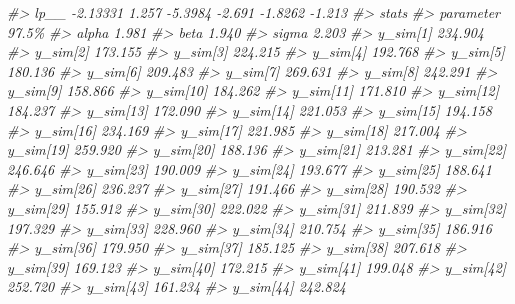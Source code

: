 \documentclass[
  10pt,
  italian,
  a4paper,
  extrafontsizes,onecolumn,openright
  ]{memoir}
\newenvironment{Shaded}{\begin{snugshade}}{\end{snugshade}}
\newcommand{\CommentTok}[1]{\textcolor[rgb]{0.56,0.35,0.01}{\textit{#1}}}
\begin{document}
\begin{Shaded}
\begin{Highlighting}[]
\CommentTok{\#\textgreater{}   lp\_\_       {-}2.13331   1.257   {-}5.3984  {-}2.691 {-}1.8262 {-}1.213}
\CommentTok{\#\textgreater{}             stats}
\CommentTok{\#\textgreater{} parameter      97.5\%}
\CommentTok{\#\textgreater{}   alpha        1.981}
\CommentTok{\#\textgreater{}   beta         1.940}
\CommentTok{\#\textgreater{}   sigma        2.203}
\CommentTok{\#\textgreater{}   y\_sim[1]   234.904}
\CommentTok{\#\textgreater{}   y\_sim[2]   173.155}
\CommentTok{\#\textgreater{}   y\_sim[3]   224.215}
\CommentTok{\#\textgreater{}   y\_sim[4]   192.768}
\CommentTok{\#\textgreater{}   y\_sim[5]   180.136}
\CommentTok{\#\textgreater{}   y\_sim[6]   209.483}
\CommentTok{\#\textgreater{}   y\_sim[7]   269.631}
\CommentTok{\#\textgreater{}   y\_sim[8]   242.291}
\CommentTok{\#\textgreater{}   y\_sim[9]   158.866}
\CommentTok{\#\textgreater{}   y\_sim[10]  184.262}
\CommentTok{\#\textgreater{}   y\_sim[11]  171.810}
\CommentTok{\#\textgreater{}   y\_sim[12]  184.237}
\CommentTok{\#\textgreater{}   y\_sim[13]  172.090}
\CommentTok{\#\textgreater{}   y\_sim[14]  221.053}
\CommentTok{\#\textgreater{}   y\_sim[15]  194.158}
\CommentTok{\#\textgreater{}   y\_sim[16]  234.169}
\CommentTok{\#\textgreater{}   y\_sim[17]  221.985}
\CommentTok{\#\textgreater{}   y\_sim[18]  217.004}
\CommentTok{\#\textgreater{}   y\_sim[19]  259.920}
\CommentTok{\#\textgreater{}   y\_sim[20]  188.136}
\CommentTok{\#\textgreater{}   y\_sim[21]  213.281}
\CommentTok{\#\textgreater{}   y\_sim[22]  246.646}
\CommentTok{\#\textgreater{}   y\_sim[23]  190.009}
\CommentTok{\#\textgreater{}   y\_sim[24]  193.677}
\CommentTok{\#\textgreater{}   y\_sim[25]  188.641}
\CommentTok{\#\textgreater{}   y\_sim[26]  236.237}
\CommentTok{\#\textgreater{}   y\_sim[27]  191.466}
\CommentTok{\#\textgreater{}   y\_sim[28]  190.532}
\CommentTok{\#\textgreater{}   y\_sim[29]  155.912}
\CommentTok{\#\textgreater{}   y\_sim[30]  222.022}
\CommentTok{\#\textgreater{}   y\_sim[31]  211.839}
\CommentTok{\#\textgreater{}   y\_sim[32]  197.329}
\CommentTok{\#\textgreater{}   y\_sim[33]  228.960}
\CommentTok{\#\textgreater{}   y\_sim[34]  210.754}
\CommentTok{\#\textgreater{}   y\_sim[35]  186.916}
\CommentTok{\#\textgreater{}   y\_sim[36]  179.950}
\CommentTok{\#\textgreater{}   y\_sim[37]  185.125}
\CommentTok{\#\textgreater{}   y\_sim[38]  207.618}
\CommentTok{\#\textgreater{}   y\_sim[39]  169.123}
\CommentTok{\#\textgreater{}   y\_sim[40]  172.215}
\CommentTok{\#\textgreater{}   y\_sim[41]  199.048}
\CommentTok{\#\textgreater{}   y\_sim[42]  252.720}
\CommentTok{\#\textgreater{}   y\_sim[43]  161.234}
\CommentTok{\#\textgreater{}   y\_sim[44]  242.824}

\end{Highlighting}
\end{Shaded}
\end{document}
